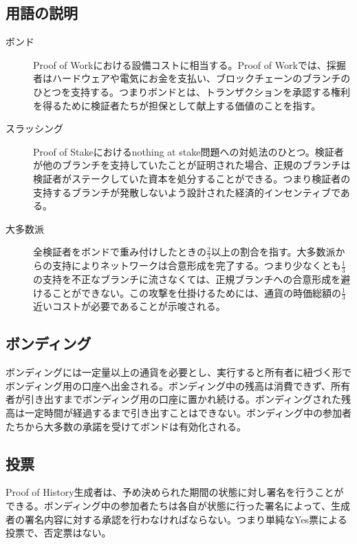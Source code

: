 \documentclass[12pt]{ltjsarticle}
\begin{document}
\subsection{用語の説明}
\begin{description}

\item[ボンド]
Proof of Workにおける設備コストに相当する。Proof of Workでは、採掘者はハードウェアや電気にお金を支払い、ブロックチェーンのブランチのひとつを支持する。つまりボンドとは、トランザクションを承認する権利を得るために検証者たちが担保として献上する価値のことを指す。

\item[スラッシング]

Proof of Stakeにおけるnothing at stake問題への対処法のひとつ\cite{slasher}。検証者が他のブランチを支持していたことが証明された場合、正規のブランチは検証者がステークしていた資本を処分することができる。つまり検証者の支持するブランチが発散しないよう設計された経済的インセンティブである。

\item[大多数派]
全検証者をボンドで重み付けしたときの\(\frac{2}{3}\)以上の割合を指す。大多数派からの支持によりネットワークは合意形成を完了する。つまり少なくとも\(\frac{1}{3}\)の支持を不正なブランチに流さなくては、正規ブランチへの合意形成を避けることができない。この攻撃を仕掛けるためには、通貨の時価総額の\(\frac{1}{3}\)近いコストが必要であることが示唆される。

\end{description}

\subsection{ボンディング}
ボンディングには一定量以上の通貨を必要とし、実行すると所有者に紐づく形でボンディング用の口座へ出金される。ボンディング中の残高は消費できず、所有者が引き出すまでボンディング用の口座に置かれ続ける。ボンディングされた残高は一定時間が経過するまで引き出すことはできない。ボンディング中の参加者たちから大多数の承諾を受けてボンドは有効化される。

\subsection{投票}
Proof of History生成者は、予め決められた期間の状態に対し署名を行うことができる。ボンディング中の参加者たちは各自が状態に行った署名によって、生成者の署名内容に対する承認を行わなければならない。つまり単純なYes票による投票で、否定票はない。
\end{document}
